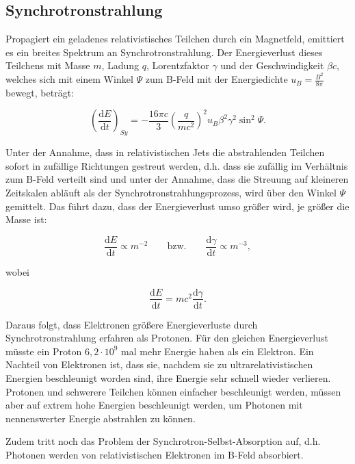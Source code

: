 \subsection{Synchrotronstrahlung}
Propagiert ein geladenes relativistisches Teilchen durch ein Magnetfeld, emittiert es ein breites Spektrum an Synchrotronstrahlung.
Der Energieverlust dieses Teilchens mit Masse $m$, Ladung $q$, Lorentzfaktor $\gamma$ und der Geschwindigkeit $\beta c$, welches sich mit einem Winkel $\Psi$ zum B-Feld mit der Energiedichte $u_B=\frac{B^2}{8\pi}$ bewegt, beträgt:

\begin{equation}
 \left( \frac{\mathrm{d}E}{\mathrm{d}t} \right)_{Sy} = - \frac{16 \pi c}{3} \left(\frac{q}{mc^2} \right)^2 u_B \beta^2 \gamma^2 \sin^2{\Psi}.
\end{equation}

Unter der Annahme, dass in relativistischen Jets die abstrahlenden Teilchen sofort in zufällige Richtungen gestreut werden, d.h. dass sie zufällig im Verhältnis zum B-Feld verteilt sind und unter der Annahme, dass die Streuung auf kleineren Zeitskalen abläuft als der Synchrotronstrahlungsprozess, wird über den Winkel $\Psi$ gemittelt.
Das führt dazu, dass der Energieverlust umso größer wird, je größer die Masse ist:

\begin{equation}
 \frac{\mathrm{d}E}{\mathrm{d}t}\propto m^{-2} \qquad \text{bzw.} \qquad \frac{\mathrm{d}\gamma}{\mathrm{d}t}\propto m^{-3},
\end{equation}

wobei 

\begin{equation}
 \frac{\mathrm{d}E}{\mathrm{d}t} = mc^2 \frac{\mathrm{d}\gamma}{\mathrm{d}t}.
\end{equation}

Daraus folgt, dass Elektronen größere Energieverluste durch Synchrotronstrahlung erfahren als Protonen.
Für den gleichen Energieverlust müsste ein Proton $6,2\cdot10^9$ mal mehr Energie haben als ein Elektron.
Ein Nachteil von Elektronen ist, dass sie, nachdem sie zu ultrarelativistischen Energien beschleunigt worden sind, ihre Energie sehr schnell wieder verlieren.
Protonen und schwerere Teilchen können einfacher beschleunigt werden,  müssen aber auf extrem hohe Energien beschleunigt werden, um Photonen mit nennenswerter Energie abstrahlen zu können.

Zudem tritt noch das Problem der Synchrotron-Selbst-Absorption auf, d.h. Photonen werden von relativistischen Elektronen im B-Feld absorbiert.\cite{RelativisticJets}

